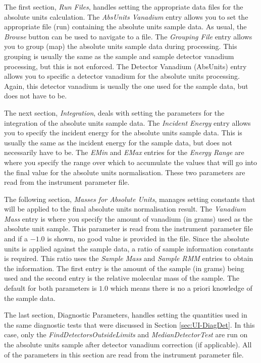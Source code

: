 The first section, \textit{Run Files}, handles setting the appropriate data files for the absolute units calculation. The \textit{AbsUnits Vanadium} entry allows you to set the appropriate file (run) containing the absolute units sample data. As usual, the \textit{Browse} button can be used to navigate to a file. The \textit{Grouping File} entry allows you to group (map) the absolute units sample data during processing. This grouping is usually the same as the sample and sample detector vanadium processing, but this is not enforced. The Detector Vanadium (AbsUnits) entry allows you to specific a detector vanadium for the absolute units processing. Again, this detector vanadium is usually the one used for the sample data, but does not have to be. 

The next section, \textit{Integration}, deals with setting the parameters for the integration of the absolute units sample data. The \textit{Incident Energy} entry allows you to specify the incident energy for the absolute units sample data. This is usually the same as the incident energy for the sample data, but does not necessarily have to be. The \textit{EMin} and \textit{EMax} entries for the \textit{Energy Range} are where you specify the range over which to accumulate the values that will go into the final value for the absolute units normalisation. These two parameters are read from the instrument parameter file.

The following section, \textit{Masses for Absolute Units}, manages setting constants that will be applied to the final absolute units normalisation result. The \textit{Vanadium Mass} entry is where you specify the amount of vanadium (in grams) used as the absolute unit sample. This parameter is read from the instrument parameter file and if a $-1.0$ is shown, no good value is provided in the file. Since the absolute units is applied against the sample data, a ratio of sample information constants is required. This ratio uses the \textit{Sample Mass} and \textit{Sample RMM} entries to obtain the information. The first entry is the amount of the sample (in grams) being used and the second entry is the relative molecular mass of the sample. The default for both parameters is $1.0$ which means there is no a priori knowledge of the sample data.

The last section, Diagnostic Parameters, handles setting the quantities used in the same diagnostic tests that were discussed in Section \ref{sec:UI-DiagDet}. In this case, only the \textit{FindDetectorsOutsideLimits} and \textit{MedianDetectorTest} are run on the absolute units sample after detector vanadium correction (if applicable). All of the parameters in this section are read from the instrument parameter file.